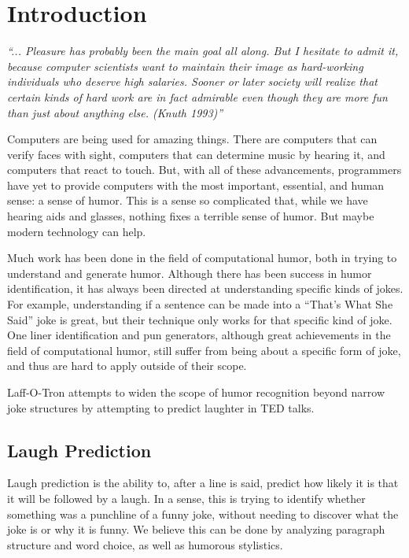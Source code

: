 \chapter{Introduction}

\textit{``... Pleasure has probably been the main goal all along. But I hesitate to admit it, because computer scientists want to maintain their image as hard-working individuals who deserve high salaries. Sooner or later society will realize that certain kinds of hard work are in fact admirable even though they are more fun than just about anything else. (Knuth 1993)''} \cite{oneliners}

Computers are being used for amazing things. There are computers that can verify faces with sight, computers that can determine music by hearing it, and computers that react to touch. But, with all of these advancements, programmers have yet to provide computers with the most important, essential, and human sense: a sense of humor. This is a sense so complicated that, while we have hearing aids and glasses, nothing fixes a terrible sense of humor. But maybe modern technology can help.

Much work has been done in the field of computational humor, both in trying to understand and generate humor. Although there has been success in humor identification, it has always been directed at understanding specific kinds of jokes. For example, understanding if a sentence can be made into a ``That's What She Said'' joke\cite{twss} is great, but their technique only works for that specific kind of joke. One liner identification \cite{oneliners} and pun generators, although great achievements in the field of computational humor, still suffer from being about a specific form of joke, and thus are hard to apply outside of their scope.

Laff-O-Tron attempts to widen the scope of humor recognition beyond narrow joke structures by attempting to predict laughter in TED talks.

\section{Laugh Prediction}
Laugh prediction is the ability to, after a line is said, predict how likely it is that it will be followed by a laugh. In a sense, this is trying to identify whether something was a punchline of a funny joke, without needing to discover what the joke is or why it is funny. We believe this can be done by analyzing paragraph structure and word choice, as well as humorous stylistics.

